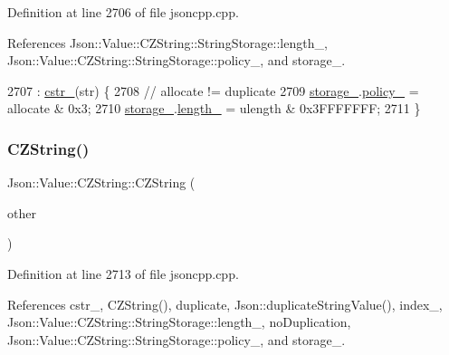 Definition at line 2706 of file jsoncpp.\+cpp.



References Json\+::\+Value\+::\+C\+Z\+String\+::\+String\+Storage\+::length\+\_\+, Json\+::\+Value\+::\+C\+Z\+String\+::\+String\+Storage\+::policy\+\_\+, and storage\+\_\+.


\begin{DoxyCode}
2707     : \hyperlink{class_json_1_1_value_1_1_c_z_string_a5b4d28349294034d7f779c3c95d0306c}{cstr\_}(str) \{
2708   \textcolor{comment}{// allocate != duplicate}
2709   \hyperlink{class_json_1_1_value_1_1_c_z_string_a17c92f0f089a4314e3b1d5695dc1a851}{storage\_}.\hyperlink{struct_json_1_1_value_1_1_c_z_string_1_1_string_storage_a7f68c8d6197c5692a525854b5f29f87b}{policy\_} = allocate & 0x3;
2710   \hyperlink{class_json_1_1_value_1_1_c_z_string_a17c92f0f089a4314e3b1d5695dc1a851}{storage\_}.\hyperlink{struct_json_1_1_value_1_1_c_z_string_1_1_string_storage_a165d865c44e6471d34668eeb4f15b140}{length\_} = ulength & 0x3FFFFFFF;
2711 \}
\end{DoxyCode}
\mbox{\label{class_json_1_1_value_1_1_c_z_string_a9685070d440335b55ef5c85747d25157}} 
\subsubsection{\texorpdfstring{C\+Z\+String()}{CZString()}\hspace{0.1cm}{\footnotesize\ttfamily [3/3]}}
{\footnotesize\ttfamily Json\+::\+Value\+::\+C\+Z\+String\+::\+C\+Z\+String (\begin{DoxyParamCaption}\item[{\hyperlink{class_json_1_1_value_1_1_c_z_string}{C\+Z\+String} const \&}]{other }\end{DoxyParamCaption})}



Definition at line 2713 of file jsoncpp.\+cpp.



References cstr\+\_\+, C\+Z\+String(), duplicate, Json\+::duplicate\+String\+Value(), index\+\_\+, Json\+::\+Value\+::\+C\+Z\+String\+::\+String\+Storage\+::length\+\_\+, no\+Duplication, Json\+::\+Value\+::\+C\+Z\+String\+::\+String\+Storage\+::policy\+\_\+, and storage\+\_\+.



